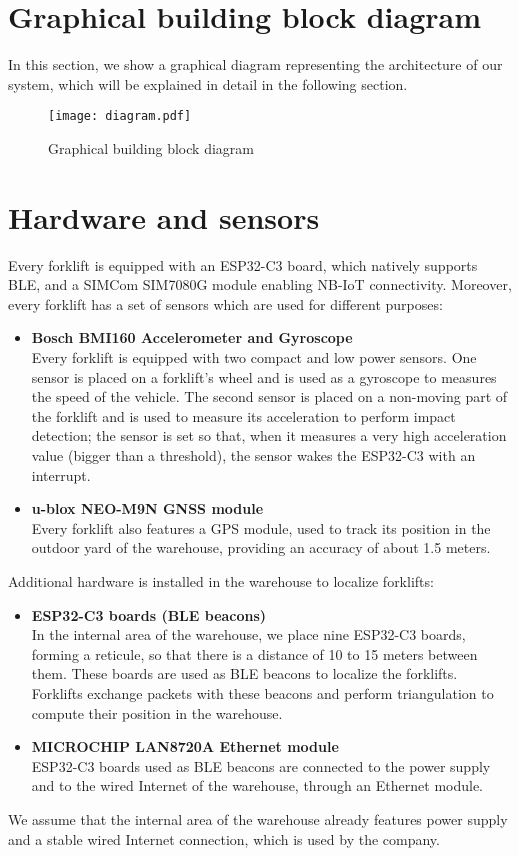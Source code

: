 \section{Graphical building block diagram}
In this section, we show a graphical diagram representing the architecture of our system, which will be explained in detail in the following section.

\begin{figure}[H]
    \centering
    \texttt{[image: diagram.pdf]}
    \caption{Graphical building block diagram}
\end{figure}

\section{Hardware and sensors}
Every forklift is equipped with an ESP32-C3 board, which natively supports BLE, and a SIMCom SIM7080G module enabling NB-IoT connectivity. Moreover, every forklift has a set of sensors which are used for different purposes:
\begin{itemize}
\item \textbf{Bosch BMI160 Accelerometer and Gyroscope}\\
Every forklift is equipped with two compact and low power sensors. One sensor is placed on a forklift’s wheel and is used as a gyroscope to measures the speed of the vehicle. The second sensor is placed on a non-moving part of the forklift and is used to measure its acceleration to perform impact detection; the sensor is set so that, when it measures a very high acceleration value (bigger than a threshold), the sensor wakes the ESP32-C3 with an interrupt.
\item \textbf{u-blox NEO-M9N GNSS module}\\
Every forklift also features a GPS module, used to track its position in the outdoor yard of the warehouse, providing an accuracy of about 1.5 meters.
\end{itemize}

Additional hardware is installed in the warehouse to localize forklifts:
\begin{itemize}
\item \textbf{ESP32-C3 boards (BLE beacons)}\\
In the internal area of the warehouse, we place nine ESP32-C3 boards, forming a reticule, so that there is a distance of 10 to 15 meters between them. These boards are used as BLE beacons to localize the forklifts. Forklifts exchange packets with these beacons and perform triangulation to compute their position in the warehouse.
\item \textbf{MICROCHIP LAN8720A Ethernet module}\\
ESP32-C3 boards used as BLE beacons are connected to the power supply and to the wired Internet of the warehouse, through an Ethernet module.
\end{itemize}
We assume that the internal area of the warehouse already features power supply and a stable wired Internet connection, which is used by the company.

